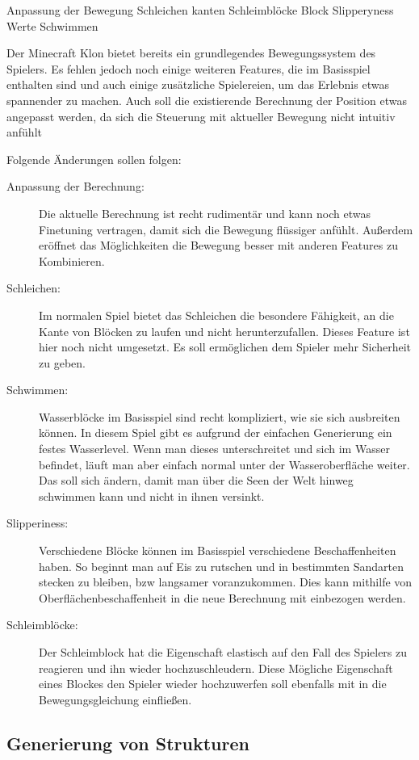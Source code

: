 \documentclass{article}
\begin{document}
Anpassung der Bewegung
Schleichen kanten
Schleimblöcke
Block Slipperyness Werte
Schwimmen

Der Minecraft Klon bietet bereits ein grundlegendes Bewegungssystem des Spielers. Es fehlen jedoch noch einige weiteren Features, die im Basisspiel enthalten sind und auch einige zusätzliche Spielereien, um das Erlebnis etwas spannender zu machen. Auch soll die existierende Berechnung der Position etwas angepasst werden, da sich die Steuerung mit aktueller Bewegung nicht intuitiv anfühlt

Folgende Änderungen sollen folgen:

\begin{description}
  \item[Anpassung der Berechnung:] Die aktuelle Berechnung ist recht rudimentär und kann noch etwas Finetuning vertragen, damit sich die Bewegung flüssiger anfühlt. Au\ss{}erdem eröffnet das Möglichkeiten die Bewegung besser mit anderen Features zu Kombinieren.
  \item[Schleichen:] Im normalen Spiel bietet das Schleichen die besondere Fähigkeit, an die Kante von Blöcken zu laufen und nicht herunterzufallen. Dieses Feature ist hier noch nicht umgesetzt. Es soll ermöglichen dem Spieler mehr Sicherheit zu geben.
  \item[Schwimmen:] Wasserblöcke im Basisspiel sind recht kompliziert, wie sie sich ausbreiten können. In diesem Spiel gibt es aufgrund der einfachen Generierung ein festes Wasserlevel. Wenn man dieses unterschreitet und sich im Wasser befindet, läuft man aber einfach normal unter der Wasseroberfläche weiter. Das soll sich ändern, damit man über die Seen der Welt hinweg schwimmen kann und nicht in ihnen versinkt.
  \item[Slipperiness:] Verschiedene Blöcke können im Basisspiel verschiedene Beschaffenheiten haben. So beginnt man auf Eis zu rutschen und in bestimmten Sandarten stecken zu bleiben, bzw langsamer voranzukommen. Dies kann mithilfe von Oberflächenbeschaffenheit in die neue Berechnung mit einbezogen werden.
  \item[Schleimblöcke:] Der Schleimblock hat die Eigenschaft elastisch auf den Fall des Spielers zu reagieren und ihn wieder hochzuschleudern. Diese Mögliche Eigenschaft eines Blockes den Spieler wieder hochzuwerfen soll ebenfalls mit in die Bewegungsgleichung einflie\ss{}en.
\end{description}

\subsection{Generierung von Strukturen}
\end{document}
